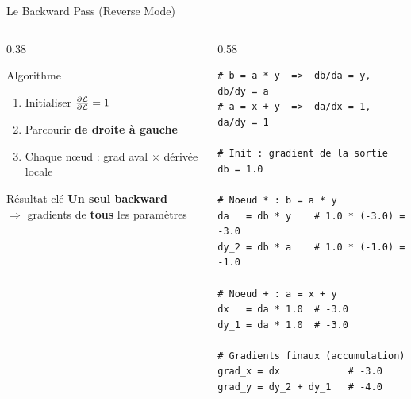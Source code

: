 \documentclass[aspectratio=169, 10pt]{beamer}
\begin{document}
\begin{frame}[fragile]{Le Backward Pass (Reverse Mode)}
  \begin{columns}[T]
    \begin{column}{0.38\textwidth}
      \begin{block}{Algorithme}
        \begin{enumerate}
          \item Initialiser $\frac{\partial \mathcal{L}}{\partial \mathcal{L}} = 1$
          \item Parcourir \textbf{de droite à gauche}
          \item Chaque nœud : grad aval $\times$ dérivée locale
        \end{enumerate}
      \end{block}
      \smallskip
      \begin{exampleblock}{Résultat clé}
        \textbf{Un seul backward}\\
        $\Rightarrow$ gradients de \textbf{tous} les paramètres
      \end{exampleblock}
    \end{column}
    \begin{column}{0.58\textwidth}
      \begin{lstlisting}[style=pythonstyle]
# b = a * y  =>  db/da = y,  db/dy = a
# a = x + y  =>  da/dx = 1,  da/dy = 1

# Init : gradient de la sortie
db = 1.0

# Noeud * : b = a * y
da   = db * y    # 1.0 * (-3.0) = -3.0
dy_2 = db * a    # 1.0 * (-1.0) = -1.0

# Noeud + : a = x + y
dx   = da * 1.0  # -3.0
dy_1 = da * 1.0  # -3.0

# Gradients finaux (accumulation)
grad_x = dx            # -3.0
grad_y = dy_2 + dy_1   # -4.0
      \end{lstlisting}
    \end{column}
  \end{columns}
\end{frame}
\end{document}
